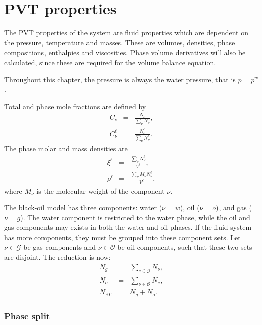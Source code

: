 \chapter{PVT properties}
\label{chap:pvt}

\minitoc

The PVT properties of the system are fluid properties which are
dependent on the pressure, temperature and masses. These are volumes,
densities, phase compositions, enthalpies and viscosities. Phase
volume derivatives will also be calculated, since these are required
for the volume balance equation.

Throughout this chapter, the pressure is always the water pressure,
that is $p=p^w$.

Total and phase mole fractions are defined by
\begin{eqnarray}
  C_\nu & = & \frac{N_\nu}{\sum_\nu N_\nu}, \\
  C_\nu^\ell & = & \frac{N_\nu^\ell}{\sum_\nu N_\nu^\ell}.
\end{eqnarray}
The phase molar and mass densities are
\begin{eqnarray}
  \xi^\ell & = & \frac{\sum_\nu N_\nu^\ell}{V^\ell}, \\
  \rho^\ell & = & \frac{\sum_\nu M_\nu N_\nu^\ell}{V^\ell},
\end{eqnarray}
where $M_\nu$ is the molecular weight of the component $\nu$.



The black-oil model has three components: water ($\nu=w$), oil
($\nu=o$), and gas ($\nu=g$). The water component is restricted to the
water phase, while the oil and gas components may exists in both the
water and oil phases. If the fluid system has more components, they
must be grouped into these component sets. Let $\nu\in\mathcal{G}$ be
gas components and $\nu\in\mathcal{O}$ be oil components, such that
these two sets are disjoint. The reduction is now:
\begin{eqnarray}
  N_g & = & \sum_{\nu\in\mathcal{G}} N_\nu, \\
  N_o & = & \sum_{\nu\in\mathcal{O}} N_\nu, \\
  N_\text{HC} & = & N_g + N_o.
\end{eqnarray}


\subsection{Phase split}

